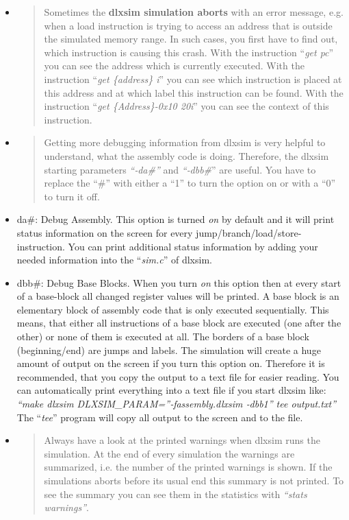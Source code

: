\begin{itemize}
\item
  \begin{quote}
  Sometimes the \textbf{dlxsim simulation aborts} with an error message,
  e.g. when a load instruction is trying to access an address that is
  outside the simulated memory range. In such cases, you first have to
  find out, which instruction is causing this crash. With the
  instruction ``\emph{get pc}'' you can see the address which is
  currently executed. With the instruction ``\emph{get \{address\} i}''
  you can see which instruction is placed at this address and at which
  label this instruction can be found. With the instruction ``\emph{get
  \{Address\}-0x10 20i}'' you can see the context of this instruction.
  \end{quote}
\item
  \begin{quote}
  Getting more debugging information from dlxsim is very helpful to
  understand, what the assembly code is doing. Therefore, the dlxsim
  starting parameters \emph{``‑da\#''} and \emph{``‑dbb\#}'' are useful.
  You have to replace the ``\#'' with either a ``1'' to turn the option
  on or with a ``0'' to turn it off.
  \end{quote}
\item
  da\#: Debug Assembly. This option is turned \emph{on} by default and
  it will print status information on the screen for every
  jump/branch/load/store-instruction. You can print additional status
  information by adding your needed information into the
  ``\emph{sim.c}'' of dlxsim.
\item
  dbb\#: Debug Base Blocks. When you turn \emph{on} this option then at
  every start of a base-block all changed register values will be
  printed. A base block is an elementary block of assembly code that is
  only executed sequentially. This means, that either all instructions
  of a base block are executed (one after the other) or none of them is
  executed at all. The borders of a base block (beginning/end) are jumps
  and labels. The simulation will create a huge amount of output on the
  screen if you turn this option on. Therefore it is recommended, that
  you copy the output to a text file for easier reading. You can
  automatically print everything into a text file if you start dlxsim
  like:\\
  \emph{``make dlxsim DLXSIM\_PARAM=''‑fassembly.dlxsim ‑dbb1''
  \textbar{} tee output.txt''}\\
  The ``\emph{tee}'' program will copy all output to the screen and to
  the file.
\item
  \begin{quote}
  Always have a look at the printed warnings when dlxsim runs the
  simulation. At the end of every simulation the warnings are
  summarized, i.e. the number of the printed warnings is shown. If the
  simulations aborts before its usual end this summary is not printed.
  To see the summary you can see them in the statistics with
  \emph{``stats warnings''}.
  \end{quote}
\end{itemize}
